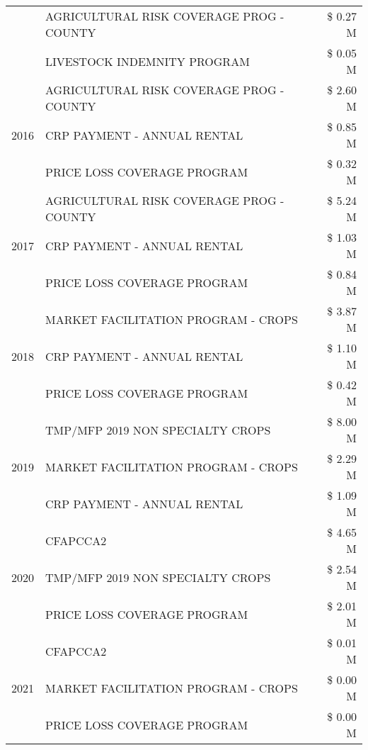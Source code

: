 \begin{tabular}{llr}
 & AGRICULTURAL RISK COVERAGE PROG - COUNTY & \$ 0.27 M \\
 & LIVESTOCK INDEMNITY PROGRAM & \$ 0.05 M \\
\cline{1-3}
\multirow[t]{3}{*}{2016} & AGRICULTURAL RISK COVERAGE PROG - COUNTY & \$ 2.60 M \\
 & CRP PAYMENT - ANNUAL RENTAL & \$ 0.85 M \\
 & PRICE LOSS COVERAGE PROGRAM & \$ 0.32 M \\
\cline{1-3}
\multirow[t]{3}{*}{2017} & AGRICULTURAL RISK COVERAGE PROG - COUNTY & \$ 5.24 M \\
 & CRP PAYMENT - ANNUAL RENTAL & \$ 1.03 M \\
 & PRICE LOSS COVERAGE PROGRAM & \$ 0.84 M \\
\cline{1-3}
\multirow[t]{3}{*}{2018} & MARKET FACILITATION PROGRAM - CROPS & \$ 3.87 M \\
 & CRP PAYMENT - ANNUAL RENTAL & \$ 1.10 M \\
 & PRICE LOSS COVERAGE PROGRAM & \$ 0.42 M \\
\cline{1-3}
\multirow[t]{3}{*}{2019} & TMP/MFP 2019 NON SPECIALTY CROPS & \$ 8.00 M \\
 & MARKET FACILITATION PROGRAM - CROPS & \$ 2.29 M \\
 & CRP PAYMENT - ANNUAL RENTAL & \$ 1.09 M \\
\cline{1-3}
\multirow[t]{3}{*}{2020} & CFAPCCA2 & \$ 4.65 M \\
 & TMP/MFP 2019 NON SPECIALTY CROPS & \$ 2.54 M \\
 & PRICE LOSS COVERAGE PROGRAM & \$ 2.01 M \\
\cline{1-3}
\multirow[t]{3}{*}{2021} & CFAPCCA2 & \$ 0.01 M \\
 & MARKET FACILITATION PROGRAM - CROPS & \$ 0.00 M \\
 & PRICE LOSS COVERAGE PROGRAM & \$ 0.00 M \\
\cline{1-3}
\bottomrule
\end{tabular}
